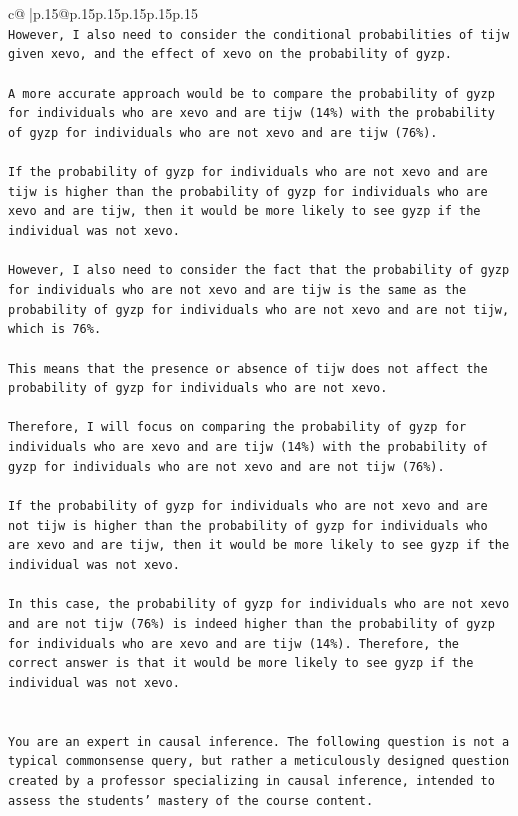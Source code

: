 \documentclass{article}
\begin{document}
{\begin{supertabular}{c@{$\;$}|p{.15\linewidth}@{}p{.15\linewidth}p{.15\linewidth}p{.15\linewidth}p{.15\linewidth}p{.15\linewidth}}
{{{\\ 
\texttt{However, I also need to consider the conditional probabilities of tijw given xevo, and the effect of xevo on the probability of gyzp. } \\
\\ 
\texttt{A more accurate approach would be to compare the probability of gyzp for individuals who are xevo and are tijw (14\%) with the probability of gyzp for individuals who are not xevo and are tijw (76\%). } \\
\\ 
\texttt{If the probability of gyzp for individuals who are not xevo and are tijw is higher than the probability of gyzp for individuals who are xevo and are tijw, then it would be more likely to see gyzp if the individual was not xevo. } \\
\\ 
\texttt{However, I also need to consider the fact that the probability of gyzp for individuals who are not xevo and are tijw is the same as the probability of gyzp for individuals who are not xevo and are not tijw, which is 76\%. } \\
\\ 
\texttt{This means that the presence or absence of tijw does not affect the probability of gyzp for individuals who are not xevo. } \\
\\ 
\texttt{Therefore, I will focus on comparing the probability of gyzp for individuals who are xevo and are tijw (14\%) with the probability of gyzp for individuals who are not xevo and are not tijw (76\%). } \\
\\ 
\texttt{If the probability of gyzp for individuals who are not xevo and are not tijw is higher than the probability of gyzp for individuals who are xevo and are tijw, then it would be more likely to see gyzp if the individual was not xevo. } \\
\\ 
\texttt{In this case, the probability of gyzp for individuals who are not xevo and are not tijw (76\%) is indeed higher than the probability of gyzp for individuals who are xevo and are tijw (14\%). Therefore, the correct answer is that it would be more likely to see gyzp if the individual was not xevo.} \\
\\ 
\\ 
\texttt{You are an expert in causal inference. The following question is not a typical commonsense query, but rather a meticulously designed question created by a professor specializing in causal inference, intended to assess the students' mastery of the course content.} \\
}}}
\end{supertabular}}
\end{document}
